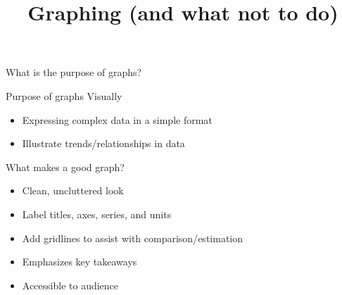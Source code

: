 \documentclass[aspectratio=169]{beamer}
\title{Graphing (and what not to do)}
\institute{Engineers for Exploration, UC San Diego}
\begin{document}
\maketitle
\begin{frame}
    What is the purpose of graphs?
\end{frame}
\begin{frame}{Purpose of graphs}
    Visually
    \begin{itemize}
        \item Expressing complex data in a simple format
        \item Illustrate trends/relationships in data
    \end{itemize}
\end{frame}
\begin{frame}{What makes a good graph?}
    \begin{itemize}
        \item Clean, uncluttered look
        \item Label titles, axes, series, and units
        \item Add gridlines to assist with comparison/estimation
        \item Emphasizes key takeaways
        \item Accessible to audience
    \end{itemize}
\end{frame}
\end{document}
